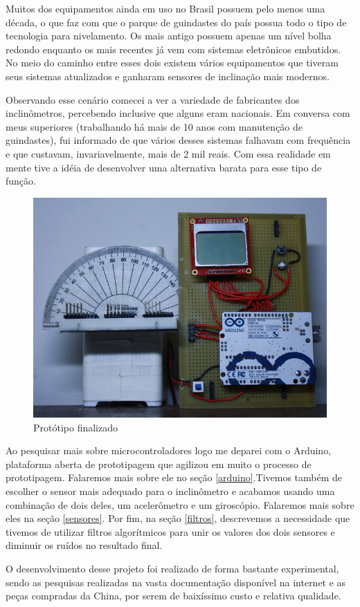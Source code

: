\documentclass[a4paper,12pt]{article}
\begin{document}
Muitos dos equipamentos ainda em uso no Brasil possuem pelo menos uma década, o que faz com que o parque de guindastes do país possua todo o tipo de tecnologia para nivelamento. Os mais antigo possuem apenas um nível bolha redondo enquanto os mais recentes já vem com sistemas eletrônicos embutidos. No meio do caminho entre esses dois existem vários equipamentos que tiveram seus sistemas atualizados e ganharam sensores de inclinação mais modernos.

Observando esse cenário comecei a ver a variedade de fabricantes dos inclinômetros, percebendo inclusive que alguns eram nacionais. Em conversa com meus superiores (trabalhando há mais de 10 anos com manutenção de guindastes), fui informado de que vários desses sistemas falhavam com frequência e que custavam, invariavelmente, mais de 2 mil reais. Com essa realidade em mente tive a idéia de desenvolver uma alternativa barata para esse tipo de função.

\begin{figure}[H]
\centering
\includegraphics[width=.5\textwidth]{img/prototipo.jpg}
\caption{Protótipo finalizado}
\end{figure}


Ao pesquisar mais sobre microcontroladores logo me deparei com o Arduino, plataforma aberta de prototipagem que agilizou em muito o processo de prototipagem. Falaremos mais sobre ele no seção \ref{arduino}.Tivemos também de escolher o sensor mais adequado para o inclinômetro e acabamos usando uma combinação de dois deles, um acelerômetro e um giroscópio. Falaremos mais sobre eles na seção \ref{sensores}. Por fim, na seção \ref{filtros}, descrevemos a necessidade que tivemos de utilizar filtros algorítmicos para unir os valores dos dois sensores e diminuir os ruídos no resultado final.

O desenvolvimento desse projeto foi realizado de forma bastante experimental, sendo as pesquisas realizadas na vasta documentação disponível na internet e as peças compradas da China, por serem de baixíssimo custo e relativa qualidade. 
\end{document}
